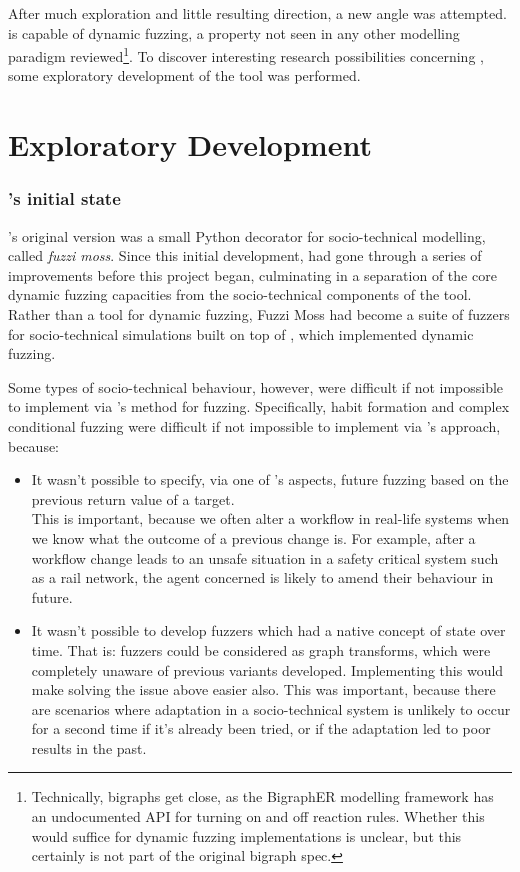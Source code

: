 \documentclass{article}
\begin{document}
After much exploration and little resulting direction, a new angle was
attempted. \pdsf{} is capable of dynamic fuzzing, a property not seen in any other
modelling paradigm reviewed\footnote{Technically, bigraphs get close, as the
  BigraphER\cite{BigraphER} modelling framework has an undocumented API for
  turning on and off reaction rules. Whether this would suffice for dynamic
  fuzzing implementations is unclear, but this certainly is not part of the
  original bigraph spec.}. To discover interesting research possibilities
concerning \pdsf{}, some exploratory development of the tool was performed.\par


\part{Exploratory Development}
\label{part:two}
\label{part:exploratory_development}
\section{\pdsf{}'s initial state}
\label{sec:pydysofu}
\pdsf{}'s original version was a small Python decorator for socio-technical
modelling, called \emph{fuzzi moss}\cite{honours_thesis}. Since this initial
development, \pdsf{} had gone through a series of improvements before this
project began, culminating in a separation of the core dynamic fuzzing
capacities from the socio-technical components of the tool. Rather than a tool
for dynamic fuzzing, Fuzzi Moss had become a suite of fuzzers for
socio-technical simulations built on top of \pdsf{}, which implemented dynamic
fuzzing.\par

Some types of socio-technical behaviour, however, were difficult if not
impossible to implement via \pdsf{}'s method for fuzzing. Specifically,
habit formation and complex conditional fuzzing were difficult if
not impossible to implement via \pdsf{}'s approach, because:

\begin{itemize}
\item It wasn't possible to specify, via one of \pdsf{}'s aspects, future
  fuzzing based on the previous return value of a target.\\
  This is important, because we often alter a workflow in real-life systems when
  we know what the outcome of a previous change is. For example, after a
  workflow change leads to an unsafe situation in a safety critical system such
  as a rail network, the agent concerned is likely to amend their behaviour in
  future.
\item It wasn't possible to develop fuzzers which had a native concept of state
  over time. That is: fuzzers could be considered as graph transforms, which
  were completely unaware of previous variants developed. Implementing this
  would make solving the issue above easier also. This was important, because
  there are scenarios where adaptation in a socio-technical system is unlikely
  to occur for a second time if it's already been tried, or if the adaptation
  led to poor results in the past.
\end{itemize}
\end{document}
